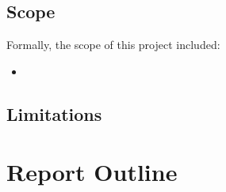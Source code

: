 \documentclass[class=report,11pt,crop=false]{standalone}
\begin{document}
\subsection{Scope}
Formally, the scope of this project included:
\begin{itemize}
    \item 
\end{itemize}

\subsection{Limitations}


\section{Report Outline}




\ifstandalone

\printnoidxglossary[type=\acronymtype,nonumberlist]
\fi
\end{document}
